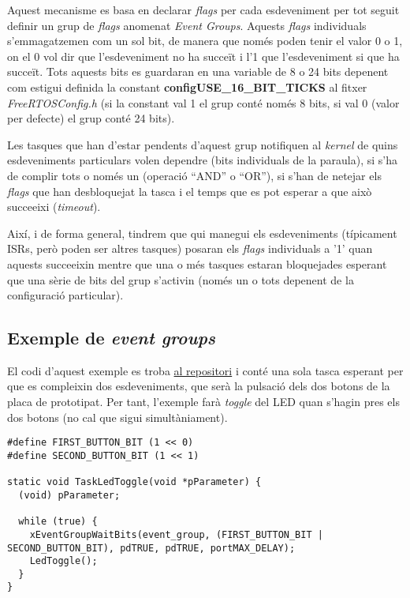 
Aquest mecanisme es basa en declarar {\em flags} per cada esdeveniment per tot seguit definir un grup de {\em flags} anomenat {\em Event Groups}. Aquests {\em flags} individuals s'emmagatzemen com un sol bit, de manera que només poden tenir el valor 0 o 1, on el 0 vol dir que l'esdeveniment no ha succeït i l'1 que l'esdeveniment si que ha succeït. Tots aquests bits es guardaran en una variable de 8 o 24 bits depenent com estigui definida la constant {\bf configUSE\_16\_BIT\_TICKS} al fitxer {\em FreeRTOSConfig.h} (si la constant val 1 el grup conté només 8 bits, si val 0 (valor per defecte) el grup conté 24 bits). 

Les tasques que han d'estar pendents d'aquest grup notifiquen al {\em kernel} de quins esdeveniments particulars volen dependre (bits individuals de la paraula), si s'ha de complir tots o només un (operació ``AND'' o ``OR''), si s'han de netejar els {\em flags} que han desbloquejat la tasca i el temps que es pot esperar a que això succeeixi ({\em timeout}).

Així, i de forma general, tindrem que qui manegui els esdeveniments  (típicament ISRs, però poden ser altres tasques) posaran els {\em flags} individuals a '1' quan aquests succeeixin mentre que una o més tasques estaran bloquejades esperant que una sèrie de bits del grup s'activin (només un o tots depenent de la configuració particular).

\subsection{Exemple de {\em event groups}}

El codi d'aquest exemple es troba \href{https://github.com/mariusmm/cursembedded/tree/master/Simplicity/FreeRTOS_EventGroups}{al repositori} i conté una sola tasca esperant per que es compleixin dos esdeveniments, que serà la pulsació dels dos botons de la placa de prototipat. Per tant, l'exemple farà {\em toggle} del LED quan s'hagin pres els dos botons (no cal que sigui simultàniament).

\begin{lstlisting}[style=customc,caption=Tasca esperant per un grup d'esdeveniments,label=EventGroupsTask]
#define FIRST_BUTTON_BIT (1 << 0)
#define SECOND_BUTTON_BIT (1 << 1)

static void TaskLedToggle(void *pParameter) {
  (void) pParameter;

  while (true) {
    xEventGroupWaitBits(event_group, (FIRST_BUTTON_BIT | SECOND_BUTTON_BIT), pdTRUE, pdTRUE, portMAX_DELAY);
    LedToggle();
  }
}
\end{lstlisting}

